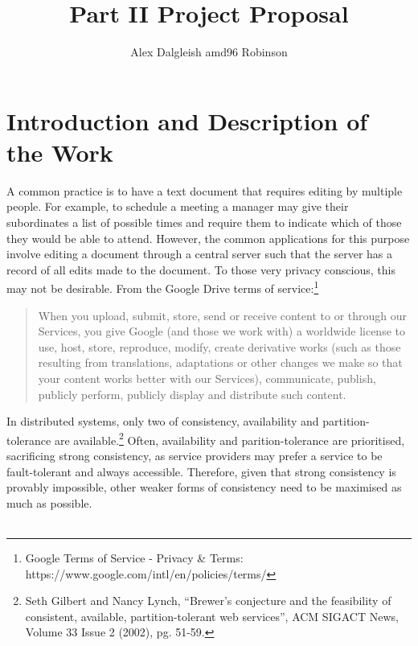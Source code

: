 \documentclass[12pt,a4paper]{article}
\author{Alex Dalgleish amd96 Robinson}
\begin{document}
\title{Part II Project Proposal}
\maketitle
\section*{Introduction and Description of the Work}
A common practice is to have a text document that requires editing by multiple people. For example, to schedule a meeting a manager may give their subordinates a list of possible times and require them to indicate which of those they would be able to attend. However, the common applications for this purpose involve editing a document through a central server such that the server has a record of all edits made to the document. To those very privacy conscious, this may not be desirable. From the Google Drive terms of service:\footnote{Google Terms of Service - Privacy \& Terms: https://www.google.com/intl/en/policies/terms/}\begin{quote}
When you upload, submit, store, send or receive content to or through our Services, you give Google (and those we work with) a worldwide license to use, host, store, reproduce, modify, create derivative works (such as those resulting from translations, adaptations or other changes we make so that your content works better with our Services), communicate, publish, publicly perform, publicly display and distribute such content.\\
\end{quote} 
In distributed systems, only two of consistency, availability and partition-tolerance are available.\footnote{Seth Gilbert and Nancy Lynch, “Brewer's conjecture and the feasibility of consistent, available, partition-tolerant web services”, ACM SIGACT News, Volume 33 Issue 2 (2002), pg. 51-59.} Often, availability and parition-tolerance are prioritised, sacrificing strong consistency, as service providers may prefer a service to be fault-tolerant and always accessible. Therefore, given that strong consistency is provably impossible, other weaker forms of consistency need to be maximised as much as possible.\\\\
\end{document}
